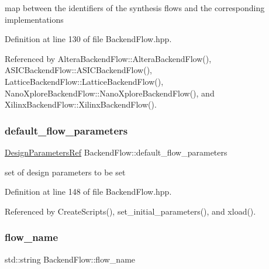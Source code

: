 map between the identifiers of the synthesis flows and the corresponding implementations 



Definition at line 130 of file Backend\+Flow.\+hpp.



Referenced by Altera\+Backend\+Flow\+::\+Altera\+Backend\+Flow(), A\+S\+I\+C\+Backend\+Flow\+::\+A\+S\+I\+C\+Backend\+Flow(), Lattice\+Backend\+Flow\+::\+Lattice\+Backend\+Flow(), Nano\+Xplore\+Backend\+Flow\+::\+Nano\+Xplore\+Backend\+Flow(), and Xilinx\+Backend\+Flow\+::\+Xilinx\+Backend\+Flow().

\mbox{\label{classBackendFlow_a2df124049b3346831ca2b60040a923d6}} 
\subsubsection{\texorpdfstring{default\+\_\+flow\+\_\+parameters}{default\_flow\_parameters}}
{\footnotesize\ttfamily \hyperlink{DesignParameters_8hpp_ae36bb1c4c9150d0eeecfe1f96f42d157}{Design\+Parameters\+Ref} Backend\+Flow\+::default\+\_\+flow\+\_\+parameters\hspace{0.3cm}{\ttfamily [protected]}}



set of design parameters to be set 



Definition at line 148 of file Backend\+Flow.\+hpp.



Referenced by Create\+Scripts(), set\+\_\+initial\+\_\+parameters(), and xload().

\mbox{\label{classBackendFlow_acb230ccab7e32cf0a88811097ff8c3f8}} 
\subsubsection{\texorpdfstring{flow\+\_\+name}{flow\_name}}
{\footnotesize\ttfamily std\+::string Backend\+Flow\+::flow\+\_\+name\hspace{0.3cm}{\ttfamily [protected]}}




